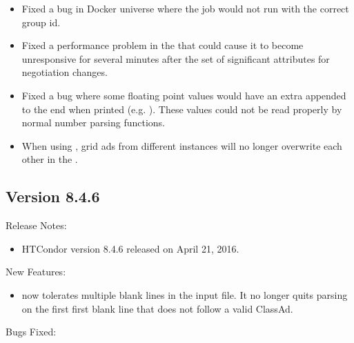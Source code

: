 \begin{itemize}

\item Fixed a bug in Docker universe where the job would
not run with the correct group id.

\item Fixed a performance problem in the  that could
cause it to become unresponsive for several minutes after the
set of significant attributes for negotiation changes.

\item Fixed a bug where some floating point values would have an extra
 appended to the end when printed (e.g. ).
These values could not be read properly by normal number parsing functions.

\item When using , grid ads from
different  instances will no longer overwrite
each other in the .

\end{itemize}

\subsection*{\label{sec:New-8-4-6}Version 8.4.6}

\noindent Release Notes:

\begin{itemize}

\item HTCondor version 8.4.6 released on April 21, 2016.

\end{itemize}


\noindent New Features:

\begin{itemize}

\item {}  now tolerates multiple blank lines in the
input file. It no longer quits parsing on the first first blank line that does not
follow a valid ClassAd.

\end{itemize}


\noindent Bugs Fixed:

